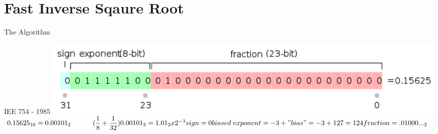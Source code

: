 \documentclass[10pt]{beamer}
\begin{document}

\section{Fast Inverse Sqaure Root}

\begin{frame}{The Algorithm}

\end{frame}

\begin{frame}{IEE 754 - 1985}
        \includegraphics[scale=0.6]{images/IEEE_754.png}
        $
        0.15625_{10} = 0.00101_{2} \hspace{11mm} (\dfrac{1}{8} + \dfrac{1}{32})
        \newline
        \newline
        0.00101_{2} = 1.01_2 x {2}^{-3}
        \newline
        \newline
        sign = 0
        \newline
        \newline
        biased \hspace{1mm} exponent = -3 + "bias" = - 3 + 127 = 124
        \newline
        \newline
        fraction = .01000..._{2}
        $
\end{frame}
\end{document}
